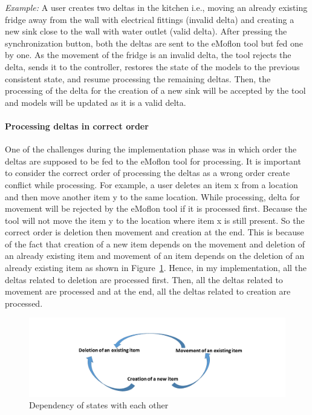 \textit{Example:} A user creates two deltas in the kitchen i.e., moving an already existing fridge away from the wall with electrical fittings (invalid delta) and creating a new sink close to the wall with water outlet (valid delta). After pressing the synchronization button, both the deltas are sent to the eMoflon tool but fed one by one. As the movement of the fridge is an invalid delta, the tool rejects the delta, sends it to the controller, restores the state of the models to the previous consistent state, and resume processing the remaining deltas. Then, the processing of the delta for the creation of a new sink will be accepted by the tool and models will be updated as it is a valid delta.

\paragraph{Processing deltas in correct order}
One of the challenges during the implementation phase was in which order the deltas are supposed to be fed to the eMoflon tool for processing. It is important to consider the correct order of processing the deltas as a wrong order create conflict while processing. For example, a user deletes an item x from a location and then move another item y to the same location. While processing, delta for movement will be rejected by the eMoflon tool if it is processed first. Because the tool will not move the item y to the location where item x is still present. So the correct order is deletion then movement and creation at the end. This is because of the fact that creation of a new item depends on the movement and deletion of an already existing item and movement of an item depends on the deletion of an already existing item as shown in Figure~\ref{fig:State_Dependency}. Hence, in my implementation, all the deltas related to deletion are processed first. Then, all the deltas related to movement are processed and at the end, all the deltas related to creation are processed.  

\begin{figure}
	\includegraphics[width=1\textwidth]{figures/State_Dependency}
	\caption{Dependency of states with each other}
	\label{fig:State_Dependency}
\end{figure}

